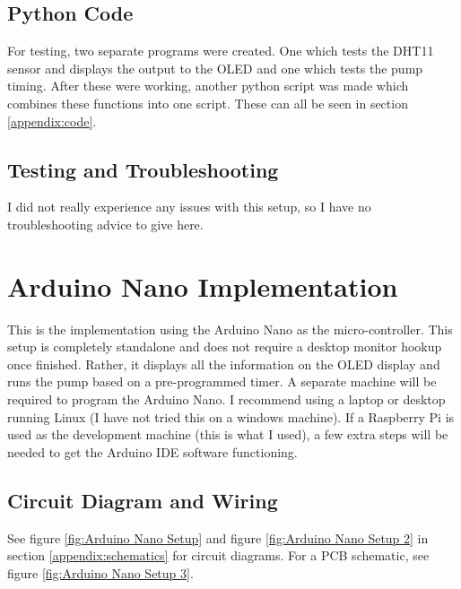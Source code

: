 \documentclass{article}
\begin{document}
\begin{multicols}{2}
		\subsection{Python Code}
		For testing, two separate programs were created. One which tests the DHT11 sensor and displays the output to the OLED and one which tests the pump timing. After these were working, another python script was made which combines these functions into one script. These can all be seen in section \ref{appendix:code}.
		
		\subsection{Testing and Troubleshooting}
		I did not really experience any issues with this setup, so I have no troubleshooting advice to give here.
		
		\section{Arduino Nano Implementation}
		This is the implementation using the Arduino Nano as the micro-controller. This setup is completely standalone and does not require a desktop monitor hookup once finished. Rather, it displays all the information on the OLED display and runs the pump based on a pre-programmed timer. A separate machine will be required to program the Arduino Nano. I recommend using a laptop or desktop running Linux (I have not tried this on a windows machine). If a Raspberry Pi is used as the development machine (this is what I used), a few extra steps will be needed to get the Arduino IDE software functioning. 
		
		\subsection{Circuit Diagram and Wiring}
		See figure \ref{fig:Arduino Nano Setup} and figure \ref{fig:Arduino Nano Setup 2} in section \ref{appendix:schematics} for circuit diagrams. For a PCB schematic, see figure \ref{fig:Arduino Nano Setup 3}.
		
		
		

\end{multicols}
\end{document}
